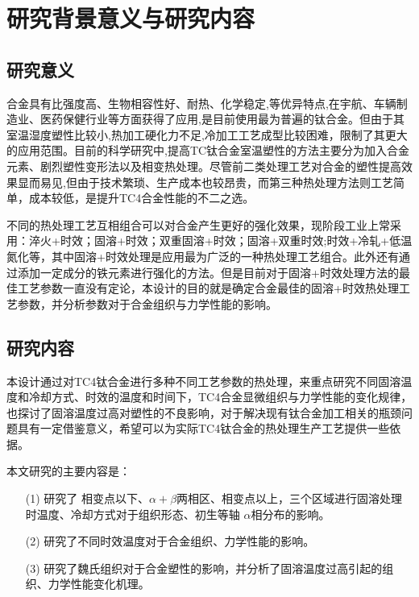 \section{研究背景意义与研究内容}
\subsection{研究意义}
\ti 合金具有比强度高、生物相容性好、耐热、化学稳定,等优异特点,在宇航、车辆制造业、医药保健行业等方面获得了应用,是目前使用最为普遍的钛合金。但由于其室温湿度塑性比较小,热加工硬化力不足,冷加工工艺成型比较困难，限制了其更大的应用范围。目前的科学研究中,提高TC钛合金室温塑性的方法主要分为加入合金元素、剧烈塑性变形法以及相变热处理。尽管前二类处理工艺对合金的塑性提高效果显而易见,但由于技术繁琐、生产成本也较昂贵\cite{miao}，而第三种热处理方法则工艺简单，成本较低，是提升TC4合金性能的不二之选。

不同的热处理工艺互相组合可以对合金产生更好的强化效果，现阶段工业上常采用\cite{zhoukaixiangJiyushenlengchulidenanjiagongcailiaoqiexiaotexingyanjiu2022}：淬火+时效；固溶+时效；双重固溶+时效；固溶+双重时效;时效+冷轧+低温氮化等，其中固溶+时效处理是应用最为广泛的一种热处理工艺组合。此外还有通过添加一定成分的铁元素进行强化的方法\cite{yuliaoMicrostructuralStrengtheningToughening2022}。但是目前对于固溶+时效处理方法的最佳工艺参数一直没有定论，本设计的目的就是确定\ti 合金最佳的固溶+时效热处理工艺参数，并分析参数对于合金组织与力学性能的影响。

\subsection{研究内容}
本设计通过对TC4钛合金进行多种不同工艺参数的热处理，来重点研究不同固溶温度和冷却方式、时效的温度和时间下，TC4合金显微组织与力学性能的变化规律，也探讨了固溶温度过高对塑性的不良影响，对于解决现有钛合金加工相关的瓶颈问题具有一定借鉴意义，希望可以为实际TC4钛合金的热处理生产工艺提供一些依据。

本文研究的主要内容是：
\begin{enumerate}[itemindent=1em]
	\item[(1)] 研究了 相变点以下、$ \alpha+\beta $两相区、相变点以上，三个区域进行固溶处理时温度、冷却方式对于组织形态、初生等轴 $ \alpha $相分布的影响。
	\item[(2)] 研究了不同时效温度对于合金组织、力学性能的影响。
	\item[(3)] 研究了魏氏组织对于合金塑性的影响，并分析了固溶温度过高引起的组织、力学性能变化机理。
\end{enumerate}

